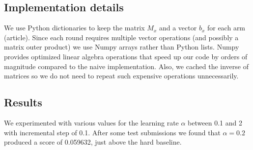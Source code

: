\documentclass[a4paper, 11pt]{article}
\begin{document}
\subsection{Implementation details}

We use Python dictionaries to keep the matrix $M_x$ and a vector $b_x$ for each arm (article). Since each round requires multiple vector operations (and possibly a matrix outer product) we use Numpy arrays rather than Python lists. Numpy provides optimized linear algebra operations that speed up our code by orders of magnitude compared to the naive implementation. Also, we cached the inverse of matrices so we do not need to repeat such expensive operations unnecessarily.

\subsection{Results}

We experimented with various values for the learning rate $\alpha$ between 0.1 and 2 with incremental step of 0.1. After some test submissions we found that $\alpha = 0.2$ produced a score of 0.059632, just above the hard baseline.
\end{document}
